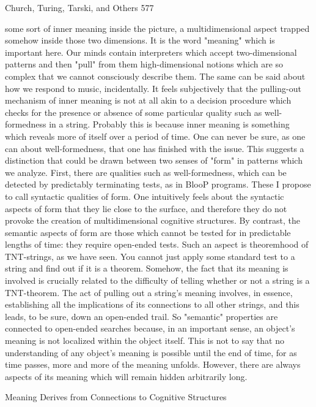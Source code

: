 {Church, Turing, Tarski, and Others                                                      577

some sort of inner meaning inside the picture, a multidimensional aspect trapped
somehow inside those two dimensions. It is the word "meaning" which is important here.
Our minds contain interpreters which accept
two-dimensional patterns and then "pull" from them high-dimensional notions which are
so complex that we cannot consciously describe them. The same can be said about how
we respond to music, incidentally.
        It feels subjectively that the pulling-out mechanism of inner meaning is not at all
akin to a decision procedure which checks for the presence or absence of some particular
quality such as well-formedness in a string. Probably this is because inner meaning is
something which reveals more of itself over a period of time. One can never be sure, as
one can about well-formedness, that one has finished with the issue.
        This suggests a distinction that could be drawn between two senses of "form" in
patterns which we analyze. First, there are qualities such as well-formedness, which can
be detected by predictably terminating tests, as in BlooP programs. These I propose to
call syntactic qualities of form. One intuitively feels about the syntactic aspects of form
that they lie close to the surface, and therefore they do not provoke the creation of
multidimensional cognitive structures.
        By contrast, the semantic aspects of form are those which cannot be tested for in
predictable lengths of time: they require open-ended tests. Such an aspect is theoremhood
of TNT-strings, as we have seen. You cannot just apply some standard test to a string and
find out if it is a theorem. Somehow, the fact that its meaning is involved is crucially
related to the difficulty of telling whether or not a string is a TNT-theorem. The act of
pulling out a string's meaning involves, in essence, establishing all the implications of its
connections to all other strings, and this leads, to be sure, down an open-ended trail. So
"semantic" properties are connected to open-ended searches because, in an important
sense, an object's meaning is not localized within the object itself. This is not to say that
no understanding of any object's meaning is possible until the end of time, for as time
passes, more and more of the meaning unfolds. However, there are always aspects of its
meaning which will remain hidden arbitrarily long.

             Meaning Derives from Connections to Cognitive Structures

}
